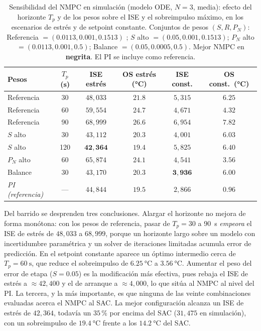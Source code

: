 \documentclass[processes,article,submit,moreauthors,pdftex]{Definitions/mdpi}
\begin{document}
\begin{table}[H]
\caption{Sensibilidad del NMPC en simulación (modelo ODE, $N=3$, media):
         efecto del horizonte $T_p$ y de los pesos sobre el ISE y el
         sobreimpulso máximo, en los escenarios de estrés y de setpoint
         constante. Conjuntos de pesos $(S,R,P_N)$: Referencia
         $=(0.0113,0.001,0.1513)$ \cite{SozaMamani2025}; $S$ alto
         $=(0.05,0.001,0.1513)$; $P_N$ alto $=(0.0113,0.001,0.5)$; Balance
         $=(0.05,0.0005,0.5)$. Mejor NMPC en \textbf{negrita}. El PI se
         incluye como referencia.}
\label{tab:nmpc_sens}
\setlength{\tabcolsep}{4pt}
\begin{tabular}{lccccc}
\toprule
\textbf{Pesos} & $T_p$ (\si{\second}) & \textbf{ISE estrés} &
\textbf{OS estrés (\si{\celsius})} & \textbf{ISE const.} &
\textbf{OS const.\ (\si{\celsius})} \\
\midrule
Referencia & 30  & $48{,}033$ & $21.8$ & $5{,}315$ & $6.25$ \\
Referencia & 60  & $59{,}554$ & $24.7$ & $4{,}671$ & $4.32$ \\
Referencia & 90  & $68{,}999$ & $26.6$ & $6{,}954$ & $7.82$ \\
$S$ alto   & 30  & $43{,}112$ & $20.3$ & $4{,}001$ & $6.03$ \\
$S$ alto   & 120 & $\mathbf{42{,}364}$ & $\mathbf{19.4}$ & $5{,}825$ & $6.40$ \\
$P_N$ alto & 60  & $65{,}874$ & $24.1$ & $4{,}541$ & $\mathbf{3.56}$ \\
Balance    & 30  & $43{,}170$ & $20.3$ & $\mathbf{3{,}936}$ & $6.00$ \\
\midrule
\emph{PI (referencia)} & --- & $44{,}844$ & $19.5$ & $2{,}866$ & $0.96$ \\
\bottomrule
\end{tabular}
\end{table}

Del barrido se desprenden tres conclusiones. Alargar el horizonte no mejora de
forma monótona: con los pesos de referencia, pasar de $T_p = 30$ a
\SI{90}{\second} \emph{empeora} el ISE de estrés de $48{,}033$ a $68{,}999$,
porque un horizonte largo sobre un modelo con incertidumbre paramétrica y un
solver de iteraciones limitadas acumula error de predicción. En el setpoint
constante aparece un óptimo intermedio cerca de $T_p = \SI{60}{\second}$, que
reduce el sobreimpulso de $\SI{6.25}{\celsius}$ a $\SI{3.56}{\celsius}$.
Aumentar el peso del error de etapa ($S = 0.05$) es la modificación más
efectiva, pues rebaja el ISE de estrés a $\approx 42{,}400$ y el de arranque a
$\approx 4{,}000$, lo que sitúa al NMPC al nivel del PI. La tercera, y la más
importante, es que ninguna de las veinte combinaciones evaluadas acerca el NMPC al
SAC. La mejor configuración alcanza un ISE de estrés de $42{,}364$, todavía un
$35\,\%$ por encima del SAC ($31{,}475$ en simulación), con un sobreimpulso de
$\SI{19.4}{\celsius}$ frente a los $\SI{14.2}{\celsius}$ del SAC.
\end{document}
